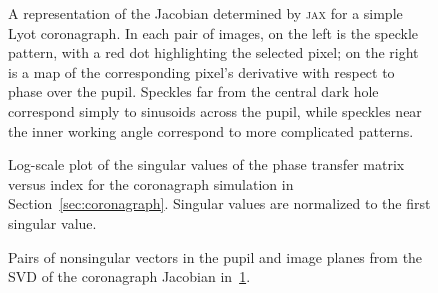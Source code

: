 \documentclass[modern]{aastex63}
\begin{document}
\begin{figure}
\caption{A representation of the Jacobian determined by \textsc{jax} for a simple Lyot coronagraph. In each pair of images, on the left is the speckle pattern, with a red dot highlighting the selected pixel; on the right is a map of the corresponding pixel's derivative with respect to phase over the pupil. Speckles far from the central dark hole correspond simply to sinusoids across the pupil, while speckles near the inner working angle correspond to more complicated patterns. \label{speckle_jacobian}}
\end{figure}


\begin{figure}
     \caption{Log-scale plot of the singular values of the phase transfer matrix versus index for the coronagraph simulation in Section~\ref{sec:coronagraph}. Singular values are normalized to the first singular value.}
    \label{fig:svd_coronagraph}
\end{figure}

\begin{figure}
\caption{Pairs of nonsingular vectors in the pupil and image planes from the SVD of the coronagraph Jacobian in~\ref{speckle_jacobian}.
\label{nonsingular_corona}} 
\end{figure}


\end{document}
